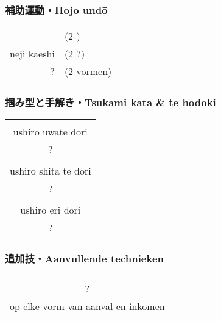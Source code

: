 \subsubsection{補助運動・Hojo und\={o}}
\begin{table}[H]
\begin{center}
\begin{tabular}{rl}
    \ruby{}{}\ruby{}{} & (2 \ruby{}{})\\
    neji kaeshi & (2 ?)\\
    ? & (2 vormen)
\end{tabular}
\end{center}
\label{kyuu_3_hojo_undou}
\end{table}

\subsubsection{掴み型と手解き・Tsukami kata \& te hodoki}
\begin{table}[H]
\begin{center}
\begin{tabular}{c}
    \ruby{}{}\ruby{}{}\\
    ushiro uwate dori\\
    ?\\
    \hline
    \ruby{}{}\\
    ushiro shita te dori\\
    ?\\
    \hline
    \ruby{}{}\\
    ushiro eri dori\\
    ?
\end{tabular}
\end{center}
\label{kyuu_3_te_hodoki}
\end{table}

\subsubsection{追加技・Aanvullende technieken}
\begin{table}[H]
\begin{center}
\begin{tabular}{c}
    \ruby{}{}\\
    ?\\
    op elke vorm van aanval en inkomen
\end{tabular}
\end{center}
\label{kyuu_3_additional}
\end{table}

